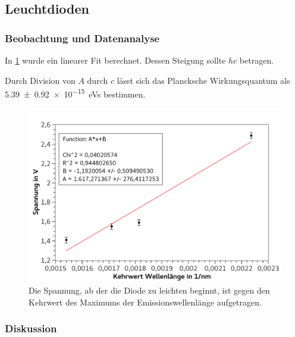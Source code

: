 \documentclass[
	a4paper,
	12pt,
	pagesize,
	ngerman
]{scrartcl}
\begin{document}
	\subsection{Leuchtdioden}
	\subsubsection{Beobachtung und Datenanalyse}
	In \cref{fig_led} wurde ein linearer Fit berechnet. 
	Dessen Steigung sollte $hc$ betragen.

	Durch Division von $A$ durch $c$ lässt sich das Plancksche Wirkungsquantum als \SI{5,39 +- 0,92 e-15}{eVs} bestimmen.

	\begin{figure}[H] %
		\includegraphics[width=1\textwidth]{fig_led} 
		\centering
		\caption{Die Spannung, ab der die Diode zu leichten beginnt, ist gegen den Kehrwert des Maximums der Emissionswellenlänge aufgetragen.}
		\label{fig_led}
		\centering
	\end{figure}	

	
	\subsubsection{Diskussion}
	
	
\end{document}
